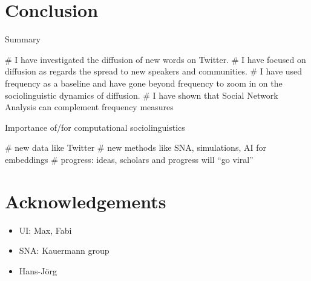 \documentclass[
  a4paper,
  abstract=on,
  captions=tableabove
  ]{scrartcl}
\begin{document}
\section{Conclusion}
  \label{sec:conclusion}

  Summary

    \begin{qitem}
      # I have investigated the diffusion of new words on Twitter.
      # I have focused on diffusion as regards the spread to new speakers and communities.
      # I have used frequency as a baseline and have gone beyond frequency to zoom in on the sociolinguistic dynamics of diffusion.
      # I have shown that Social Network Analysis can complement frequency measures
    \end{qitem}

  Importance of/for computational sociolinguistics

    \begin{qitem}
      # new data like Twitter
      # new methods like SNA, simulations, AI for embeddings
      # progress: ideas, scholars and progress will ``go viral''
    \end{qitem}


\printbibliography

\section*{Acknowledgements}

\begin{itemize}
  \item UI: Max, Fabi
  \item SNA: Kauermann group
  \item Hans-Jörg
\end{itemize}
\end{document}
